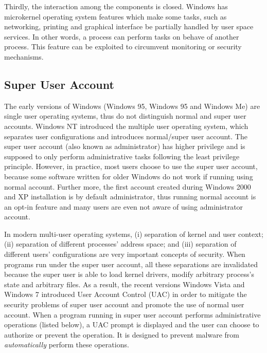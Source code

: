Thirdly, the interaction among the components is closed.
Windows has microkernel operating system features which make
some tasks, such as networking, printing and graphical interface be partially
handled by user space services.
In other words, a process can perform tasks on behave of another process.
This feature can be exploited to circumvent monitoring or
security mechanisms.

\subsection{Super User Account}

The early versions of Windows (Windows 95, Windows 95 and Windows Me)
are single user operating systems, thus do not distinguish normal and
super user accounts.
Windows NT introduced the multiple user operating system, which
separates user configurations and introduces normal/super user account.
The super user account (also known as administrator) has higher privilege and
is supposed to only perform administrative tasks following the
least privilege principle.
However, in practice,
most users choose to use the super user account,
because some software written for older Windows do not work if running using
normal account.
Further more, the first account created during Windows 2000 and XP installation
is by default administrator,
thus running normal account is an opt-in feature and
many users are even not aware of using administrator account.

In modern multi-user operating systems,
(i) separation of kernel and user context;
(ii) separation of different processes' address space; and
(iii) separation of different users' configurations are
very important concepts of security.
When programs run under the super user account,
all these separations are invalidated because the super user
is able to load kernel drivers, modify arbitrary process's state
and arbitrary files.
As a result, the recent versions Windows Vista and Windows 7 introduced
User Account Control (UAC) in order to mitigate the security problems of
super user account and promote the use of normal user account.
When a program running in super user account performs administrative
operations (listed below),
a UAC prompt is displayed and the user can choose to authorize or prevent
the operation.
It is designed to prevent malware from {\em automatically}
perform these operations.


